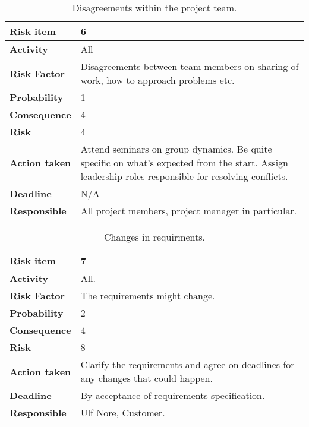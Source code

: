 \begin{table}[h!]
\begin{center}
\begin{tabularx}{\textwidth}{| X | X |}
\hline
\textbf{Risk item} & 6 \\
\hline
\textbf{Activity} & All \\
\hline
\textbf{Risk Factor} & Disagreements between team members on sharing of work, how to approach problems etc. \\
\hline
\textbf{Probability} & 1 \\
\hline
\textbf{Consequence} & 4 \\
\hline
\textbf{Risk} & 4 \\
\hline
\textbf{Action taken} & Attend seminars on group dynamics. Be quite specific on what's expected from the start. Assign leadership roles responsible for resolving conflicts. \\
\hline
\textbf{Deadline} & N/A \\
\hline
\textbf{Responsible} & All project members, project manager in particular. \\
\hline
\end{tabularx}
\caption{Disagreements within the project team.}
\end{center}
\label{risk_9}
\end{table}




\begin{table}[h!]
\begin{center}
\begin{tabularx}{\textwidth}{| X | X |}
\hline
\textbf{Risk item} & 7 \\
\hline
\textbf{Activity} & All. \\
\hline
\textbf{Risk Factor} & The requirements might change. \\
\hline
\textbf{Probability} & 2 \\
\hline
\textbf{Consequence} & 4 \\
\hline
\textbf{Risk} & 8 \\
\hline
\textbf{Action taken} & Clarify the requirements and agree on deadlines for any changes that could happen.\\
\hline
\textbf{Deadline} & By acceptance of requirements specification. \\
\hline
\textbf{Responsible} & Ulf Nore, Customer. \\
\hline
\end{tabularx}
\caption{Changes in requirments.}
\end{center}
\label{risk_1}
\end{table}


